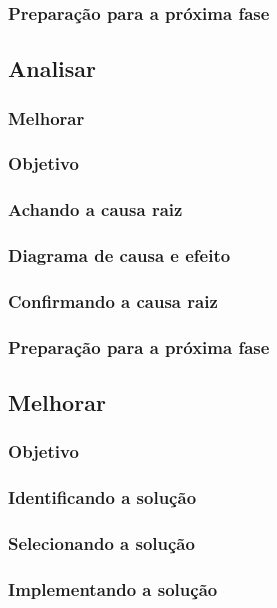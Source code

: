\documentclass{abnt}
\begin{document}
					\subsubsection {Preparação para a próxima fase}
				\subsection {Analisar}
					\subsubsection {Melhorar}
					\subsubsection {Objetivo}
					\subsubsection {Achando a causa raiz}
					\subsubsection {Diagrama de causa e efeito}
					\subsubsection {Confirmando a causa raiz}
					\subsubsection {Preparação para a próxima fase}
				\subsection {Melhorar}
					\subsubsection {Objetivo}
					\subsubsection {Identificando a solução}
					\subsubsection {Selecionando a solução}
					\subsubsection {Implementando a solução}
\end{document}
